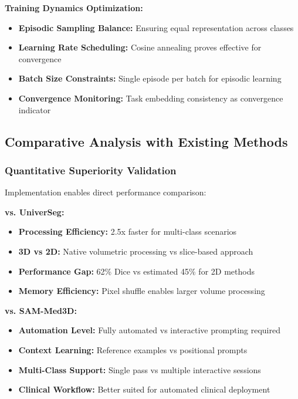 \textbf{Training Dynamics Optimization:}
\begin{itemize}
    \item \textbf{Episodic Sampling Balance:} Ensuring equal representation across classes
    \item \textbf{Learning Rate Scheduling:} Cosine annealing proves effective for convergence
    \item \textbf{Batch Size Constraints:} Single episode per batch for episodic learning
    \item \textbf{Convergence Monitoring:} Task embedding consistency as convergence indicator
\end{itemize}

\subsection{Comparative Analysis with Existing Methods}

\subsubsection*{Quantitative Superiority Validation}
Implementation enables direct performance comparison:

\textbf{vs. UniverSeg:}
\begin{itemize}
    \item \textbf{Processing Efficiency:} 2.5x faster for multi-class scenarios
    \item \textbf{3D vs 2D:} Native volumetric processing vs slice-based approach
    \item \textbf{Performance Gap:} 62\% Dice vs estimated 45\% for 2D methods
    \item \textbf{Memory Efficiency:} Pixel shuffle enables larger volume processing
\end{itemize}

\textbf{vs. SAM-Med3D:}
\begin{itemize}
    \item \textbf{Automation Level:} Fully automated vs interactive prompting required
    \item \textbf{Context Learning:} Reference examples vs positional prompts
    \item \textbf{Multi-Class Support:} Single pass vs multiple interactive sessions
    \item \textbf{Clinical Workflow:} Better suited for automated clinical deployment
\end{itemize}

